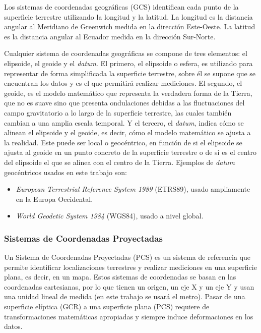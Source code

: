 \documentclass[12pt,a4paper,]{book}
\providecommand{\tightlist}{%
  \setlength{\itemsep}{0pt}\setlength{\parskip}{0pt}}
\numberwithin{dummy}{section}
\theoremstyle{ocrenumbox}
\theoremstyle{blacknumex}
\theoremstyle{blacknumbox}
\theoremstyle{ocrenum}
\theoremstyle{ocrenum}
\begin{document}
Los sistemas de coordenadas geográficas (GCS) identifican cada punto de
la superficie terrestre utilizando la longitud y la latitud. La longitud
es la distancia angular al Meridiano de Greenwich medida en la dirección
Este-Oeste. La latitud es la distancia angular al Ecuador medida en la
dirección Sur-Norte.

Cualquier sistema de coordenadas geográficas se compone de tres
elementos: el elipsoide, el geoide y el \emph{datum}. El primero, el
elipsoide o esfera, es utilizado para representar de forma simplificada
la superficie terrestre, sobre él se supone que se encuentran los datos
y es el que permitirá realizar mediciones. El segundo, el geoide, es el
modelo matemático que representa la verdadera forma de la Tierra, que no
es suave sino que presenta ondulaciones debidas a las fluctuaciones del
campo gravitatorio a lo largo de la superficie terrestre, las cuales
también cambian a una amplia escala temporal. Y el tercero, el
\emph{datum}, indica cómo se alinean el elipsoide y el geoide, es decir,
cómo el modelo matemático se ajusta a la realidad. Este puede ser local
o geocéntrico, en función de si el elipsoide se ajusta al geoide en un
punto concreto de la superficie terrestre o de si es el centro del
elipsoide el que se alinea con el centro de la Tierra. Ejemplos de
\emph{datum} geocéntricos usados en este trabajo son:

\begin{itemize}
\tightlist
\item
  \emph{European Terrestrial Reference System 1989} (ETRS89), usado
  ampliamente en la Europa Occidental.
\item
  \emph{World Geodetic System 1984} (WGS84), usado a nivel global.
\end{itemize}

\hypertarget{sistemas-de-coordenadas-proyectadas}{%
\subsubsection*{Sistemas de Coordenadas
Proyectadas}\label{sistemas-de-coordenadas-proyectadas}}

Un Sistema de Coordenadas Proyectadas (PCS) es un sistema de referencia
que permite identificar localizaciones terrestres y realizar mediciones
en una superficie plana, es decir, en un mapa. Estos sistemas de
coordenadas se basan en las coordenadas cartesianas, por lo que tienen
un origen, un eje X y un eje Y y usan una unidad lineal de medida (en
este trabajo se usará el metro). Pasar de una superficie elíptica (GCR)
a una superficie plana (PCS) requiere de transformaciones matemáticas
apropiadas y siempre induce deformaciones en los datos.
\end{document}

